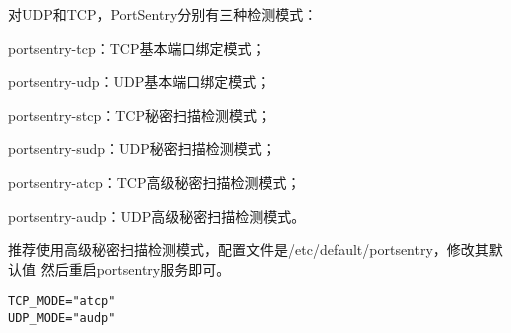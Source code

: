 对UDP和TCP，PortSentry分别有三种检测模式：

\begin{itemize*}
  \item portsentry-tcp：TCP基本端口绑定模式；
  \item portsentry-udp：UDP基本端口绑定模式；
  \item portsentry-stcp：TCP秘密扫描检测模式；
  \item portsentry-sudp：UDP秘密扫描检测模式；
  \item portsentry-atcp：TCP高级秘密扫描检测模式；
  \item portsentry-audp：UDP高级秘密扫描检测模式。
\end{itemize*}

推荐使用高级秘密扫描检测模式，配置文件是/etc/default/portsentry，修改其默认值%
然后重启portsentry服务即可。

\begin{Verbatim}[]
TCP_MODE="atcp"
UDP_MODE="audp"
\end{Verbatim}
